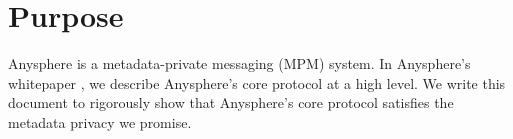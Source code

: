 \section{Purpose}
\label{sec:purpose}
Anysphere is a metadata-private messaging (MPM) system. In Anysphere's whitepaper \cite[Section 3]{whitepaper}, we describe Anysphere's core protocol at a high level. We write this document to rigorously show that Anysphere's core protocol satisfies the metadata privacy we promise. 

